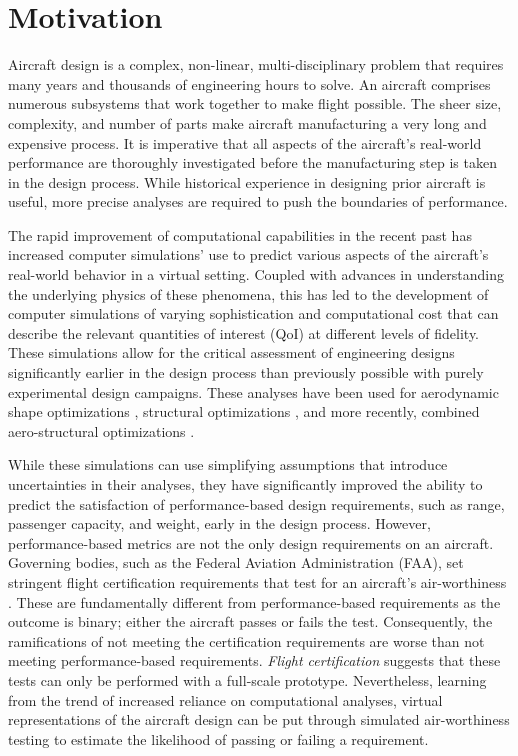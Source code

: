\section{Motivation}\label{intro_motivation}

Aircraft design is a complex, non-linear, multi-disciplinary problem that requires many years and thousands of engineering hours to solve.
An aircraft comprises numerous subsystems that work together to make flight possible.
The sheer size, complexity, and number of parts make aircraft manufacturing a very long and expensive process.
It is imperative that all aspects of the aircraft's real-world performance are thoroughly investigated before the manufacturing step is taken in the design process.
While historical experience in designing prior aircraft is useful, more precise analyses are required to push the boundaries of performance. 

The rapid improvement of computational capabilities in the recent past has increased computer simulations' use to predict various aspects of the aircraft's real-world behavior in a virtual setting.
Coupled with advances in understanding the underlying physics of these phenomena, this has led to the development of computer simulations of varying sophistication and computational cost that can describe the relevant quantities of interest (QoI) at different levels of fidelity.
These simulations allow for the critical assessment of engineering designs significantly earlier in the design process than previously possible with purely experimental design campaigns.
These analyses have been used for aerodynamic shape optimizations \cite{jameson1988aerodynamic,anderson_aerodynamic_1999,chen2016aerodynamic}, structural optimizations \cite{bindolino2010multilevel,kirsch2012structural,zhu2016topology}, and more recently, combined aero-structural optimizations \cite{gray2019openmdao,brooks2018benchmark}.

While these simulations can use simplifying assumptions that introduce uncertainties in their analyses, they have significantly improved the ability to predict the satisfaction of performance-based design requirements, such as range, passenger capacity, and weight, early in the design process.
However, performance-based metrics are not the only design requirements on an aircraft. 
Governing bodies, such as the Federal Aviation Administration (FAA), set stringent flight certification requirements that test for an aircraft's air-worthiness \cite{romanowski_flight_2018}.
These are fundamentally different from performance-based requirements as the outcome is binary; either the aircraft passes or fails the test.
Consequently, the ramifications of not meeting the certification requirements are worse than not meeting performance-based requirements. 
\textit{Flight certification} suggests that these tests can only be performed with a full-scale prototype.
Nevertheless, learning from the trend of increased reliance on computational analyses, virtual representations of the aircraft design can be put through simulated air-worthiness testing to estimate the likelihood of passing or failing a requirement. 

